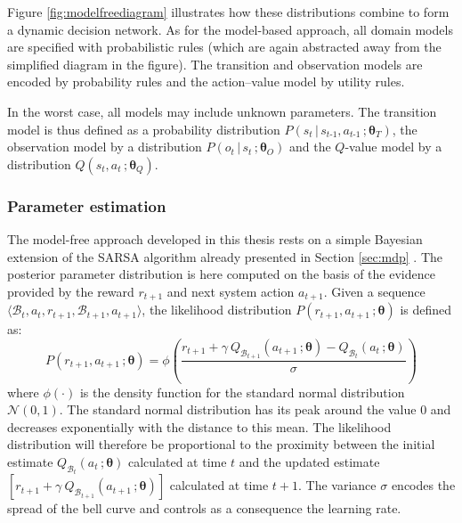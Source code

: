 Figure \ref{fig:modelfreediagram} illustrates how these distributions combine to form a dynamic decision network. As for the model-based approach, all domain models are specified with probabilistic rules (which are again abstracted away from the simplified diagram in the figure). The transition and observation models are encoded by probability rules and the action--value model by utility rules. 

In the worst case, all models may include unknown parameters.  The transition model is thus defined as a probability distribution $P(s_t \, | \, s_{t\mbox{-}1}, a_{t\mbox{-}1} \,; \boldsymbol\theta_T)$, the observation model by a distribution $P(o_t \, | \, s_t\,; \boldsymbol\theta_O)$ and the $Q$-value model by a distribution $Q(s_t,a_t\,; \boldsymbol\theta_Q)$.  

\subsubsection*{Parameter estimation}


The model-free approach developed in this thesis rests on a simple Bayesian extension of the SARSA algorithm already presented in Section \ref{sec:mdp} .  The posterior parameter distribution is here computed on the basis of the evidence provided by the reward $r_{t+1}$ and next system action $a_{t+1}$.  Given a sequence $\langle \mathcal{B}_t, a_t, r_{t+1}, \mathcal{B}_{t+1}, a_{t+1} \rangle$, the likelihood distribution $P(r_{t+1}, a_{t+1} \,; \boldsymbol\theta)$ is defined as:
\begin{equation}
P(r_{t+1}, a_{t+1} \,; \boldsymbol\theta) = \phi \left(\frac{r_{t+1} + \gamma \ Q_{\mathcal{B}_{t+1}} \left(a_{t+1} \,; \boldsymbol\theta\right) - Q_{\mathcal{B}_t}\left(a_t \,; \boldsymbol\theta\right)}{\sigma} \right) \label{eq:modelfreelikelihood}
\end{equation}
where $\phi(\cdot)$ is the density function for the standard normal distribution $\mathcal{N}(0, 1)$. The standard normal distribution has its peak around the value 0 and decreases exponentially with the distance to this mean. The likelihood distribution will therefore  be proportional to the proximity between the initial estimate 
$Q_{\mathcal{B}_t}(a_t \,; \boldsymbol\theta)$ calculated at time $t$ and the updated estimate $\left[r_{t+1} + \gamma \ Q_{\mathcal{B}_{t+1}} (a_{t+1} \,; \boldsymbol\theta) \right]$ calculated at time $t+1$. The variance $\sigma$ encodes the spread of the bell curve and controls as a consequence the learning rate.

